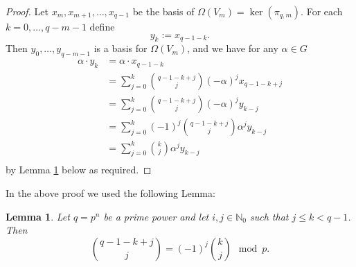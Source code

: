 \documentclass[a4paper]{amsart}
\def\N{\mathbb{N}}
\newtheorem{Lemma}{Lemma}[section]
\theoremstyle{definition}
\theoremstyle{remark}
\theoremstyle{Acknowledgments}
\begin{document}
\begin{proof} Let $x_{m},x_{m+1}, \ldots, x_{q-1}$ be the basis of $\Omega(V_m) = \ker(\pi_{q,m})$. For each $k=0, \ldots, q-m-1$ define
\[y_k:= x_{q-1-k}.\] Then $y_0, \ldots, y_{q-m-1}$ is a basis for  $\Omega(V_m)$, and we have for any $\alpha \in G$
\begin{align*}
\alpha \cdot y_k &= \alpha \cdot x_{q-1-k}\\
&= \sum_{j=0}^k \binom{q-1-k+j}{j}(-\alpha)^j x_{q-1-k+j}\\
&= \sum_{j=0}^k  \binom{q-1-k+j}{j}(-\alpha)^j y_{k-j}\\
&= \sum_{j=0}^k (-1)^j  \binom{q-1-k+j}{j} \alpha^j y_{k-j}\\
&= \sum_{j=0}^k   \binom{k}{j} \alpha^j y_{k-j}\\
\end{align*}
by Lemma \ref{binomialmodp} below as required.
\end{proof}

In the above proof we used the following Lemma:

\begin{Lemma}\label{binomialmodp} Let $q=p^n$ be a prime power and let $i, j \in \N_0$ such that $j \leq k <q-1$. Then
\[\binom{q-1-k+j}{j} = (-1)^j\binom{k}{j} \mod p.\]
 \end{Lemma}
\end{document}
